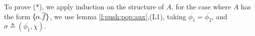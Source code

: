  To prove (*), we apply induction on the structure of $A$. for the case where $A$ has the form $\langle\!\!\langle \alpha.\overline f \rangle\!\!\rangle$, we use lemma \ref{l:push:pop:aux},(L1), taking $\overline {\phi_1} = \overline { \phi_2}$, and $\sigma \triangleq (\overline {\phi_1},\chi).$
\\
\completeProofSub
 

\vspace{1cm}

